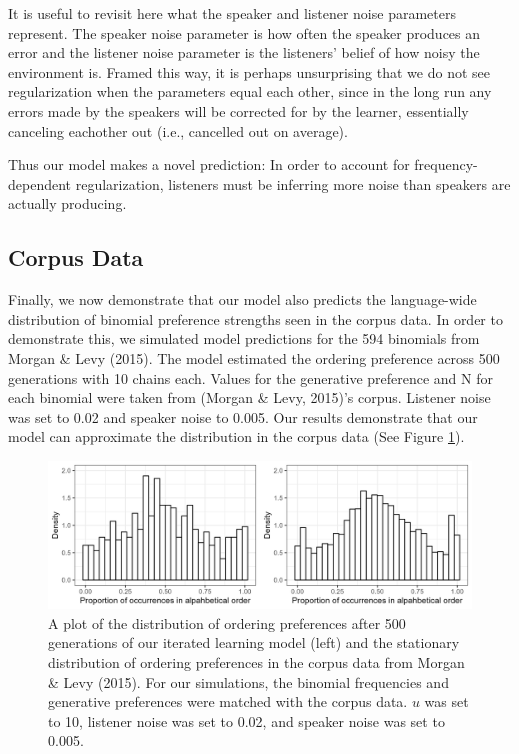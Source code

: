 \documentclass[10pt, letterpaper]{article}
\newenvironment{CodeChunk}{}{}
\begin{document}
It is useful to revisit here what the speaker and listener noise
parameters represent. The speaker noise parameter is how often the
speaker produces an error and the listener noise parameter is the
listeners' belief of how noisy the environment is. Framed this way, it
is perhaps unsurprising that we do not see regularization when the
parameters equal each other, since in the long run any errors made by
the speakers will be corrected for by the learner, essentially canceling
eachother out (i.e., cancelled out on average).

Thus our model makes a novel prediction: In order to account for
frequency-dependent regularization, listeners must be inferring more
noise than speakers are actually producing.

\hypertarget{corpus-data}{%
\subsection{Corpus Data}\label{corpus-data}}

Finally, we now demonstrate that our model also predicts the
language-wide distribution of binomial preference strengths seen in the
corpus data. In order to demonstrate this, we simulated model
predictions for the 594 binomials from Morgan \& Levy (2015). The model
estimated the ordering preference across 500 generations with 10 chains
each. Values for the generative preference and N for each binomial were
taken from (Morgan \& Levy, 2015)'s corpus. Listener noise was set to
0.02 and speaker noise to 0.005. Our results demonstrate that our model
can approximate the distribution in the corpus data (See Figure
\ref{fig:corpusourmodel}).

\begin{CodeChunk}
\begin{figure}[tb]

{\centering \includegraphics[width=1\linewidth]{Figures/corpus_plot_and_ours} 

}

\caption[A plot of the distribution of ordering preferences after 500 generations of our iterated learning model (left) and the stationary distribution of ordering preferences in the corpus data from Morgan \& Levy (2015)]{A plot of the distribution of ordering preferences after 500 generations of our iterated learning model (left) and the stationary distribution of ordering preferences in the corpus data from Morgan \& Levy (2015). For our simulations, the binomial frequencies and generative preferences were matched with the corpus data. $
u$ was set to 10, listener noise was set to 0.02, and speaker noise was set to 0.005.}\label{fig:corpusourmodel}
\end{figure}
\end{CodeChunk}
\end{document}
